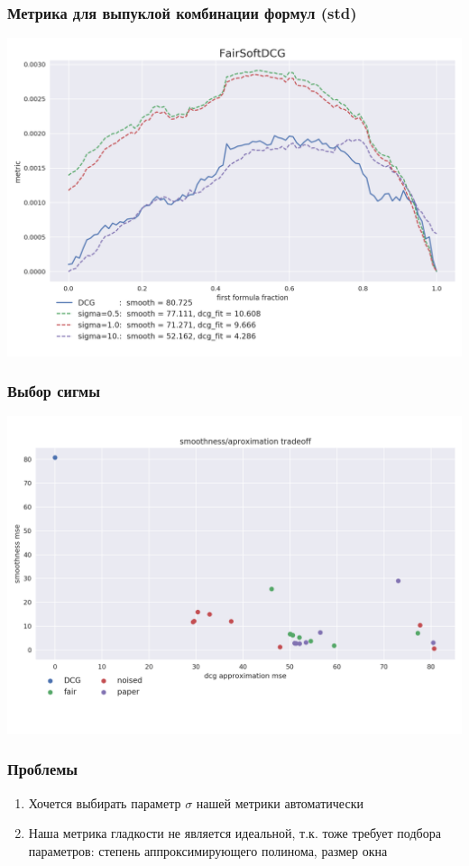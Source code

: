 \documentclass[10pt]{beamer}
\begin{document}
\begin{frame}
\frametitle{Метрика для выпуклой комбинации формул (std)}
\includegraphics[width=\textwidth]{fair_formula_mix_std}
\end{frame}


\begin{frame}
\frametitle{Выбор сигмы}
\includegraphics[width=\textwidth]{tradeoff_max_min}
\end{frame}


\begin{frame}
\frametitle{Проблемы}
\begin{enumerate}
\item Хочется выбирать параметр $\sigma$ нашей метрики автоматически
\item Наша метрика гладкости не является идеальной, т.к. тоже требует подбора параметров:
степень аппроксимирующего полинома, размер окна
\end{enumerate}
\end{frame}
\end{document}
